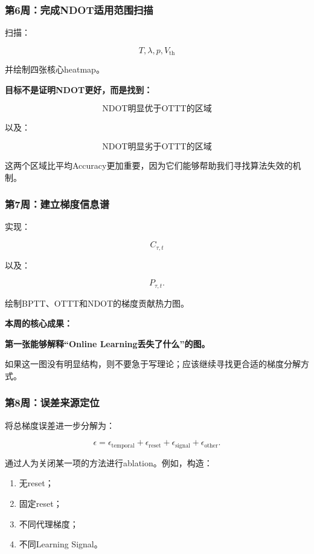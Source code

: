 \documentclass[journal,12pt,onecolumn]{IEEEtran}
\begin{document}
\subsubsection{第6周：完成NDOT适用范围扫描}

扫描：

\[
T,\lambda,p,V_{\mathrm{th}}
\]

并绘制四张核心heatmap。

\textbf{目标不是证明NDOT更好，而是找到：}

\[
\boxed{
\text{NDOT明显优于OTTT的区域}
}
\]

以及：

\[
\boxed{
\text{NDOT明显劣于OTTT的区域}
}
\]

这两个区域比平均Accuracy更加重要，因为它们能够帮助我们寻找算法失效的机制。

\subsubsection{第7周：建立梯度信息谱}

实现：

\[
C_{\tau,t}
\]

以及：

\[
P_{\tau,t}.
\]

绘制BPTT、OTTT和NDOT的梯度贡献热力图。

\textbf{本周的核心成果：}

\begin{center}
\textbf{第一张能够解释“Online Learning丢失了什么”的图。}
\end{center}

如果这一图没有明显结构，则不要急于写理论；应该继续寻找更合适的梯度分解方式。

\subsubsection{第8周：误差来源定位}

将总梯度误差进一步分解为：

\[
\epsilon
=
\epsilon_{\mathrm{temporal}}
+
\epsilon_{\mathrm{reset}}
+
\epsilon_{\mathrm{signal}}
+
\epsilon_{\mathrm{other}}.
\]

通过人为关闭某一项的方法进行ablation。例如，构造：

\begin{enumerate}
    \item 无reset；
    \item 固定reset；
    \item 不同代理梯度；
    \item 不同Learning Signal。
\end{enumerate}
\end{document}
